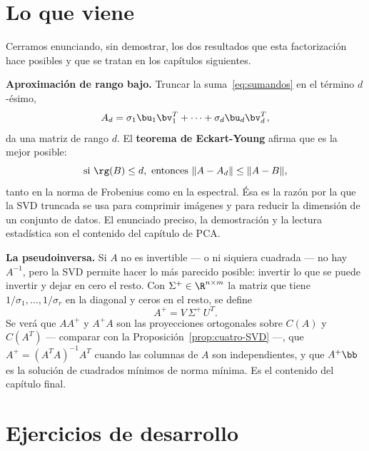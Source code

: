 \section{Lo que viene}
\label{sec:lo-que-viene}

Cerramos enunciando, sin demostrar, los dos resultados que esta factorización
hace posibles y que se tratan en los capítulos siguientes.

\medskip
\noindent\textbf{Aproximación de rango bajo.} Truncar la
suma~\eqref{eq:sumandos} en el término $d$-ésimo,
\[
A_d=\sigma_1\bu_1\bv_1^T+\cdots+\sigma_d\bu_d\bv_d^T ,
\]
da una matriz de rango $d$. El \textbf{teorema de Eckart-Young} afirma que es
la mejor posible:
\[
\text{si } \rg(B)\le d, \text{ entonces } \|A-A_d\|\le\|A-B\| ,
\]
tanto en la norma de Frobenius como en la espectral. Ésa es la razón por la
que la SVD truncada se usa para comprimir imágenes y para reducir la
dimensión de un conjunto de datos. El enunciado preciso, la demostración y la
lectura estadística son el contenido del capítulo de PCA.

\medskip
\noindent\textbf{La pseudoinversa.} Si $A$ no es invertible --- o ni siquiera
cuadrada --- no hay $A^{-1}$, pero la SVD permite hacer lo más parecido
posible: invertir lo que se puede invertir y dejar en cero el resto. Con
$\Sigma^+\in\R^{n\times m}$ la matriz que tiene $1/\sigma_1,\dots,1/\sigma_r$
en la diagonal y ceros en el resto, se define
\[
A^+=V\,\Sigma^+\,U^T .
\]
Se verá que $AA^+$ y $A^+A$ son las proyecciones ortogonales sobre $C(A)$ y
$C(A^T)$ --- comparar con la Proposición~\ref{prop:cuatro-SVD} ---, que
$A^+=(A^TA)^{-1}A^T$ cuando las columnas de $A$ son independientes, y que
$A^+\bb$ es la solución de cuadrados mínimos de norma mínima. Es el contenido
del capítulo final.

\section*{Ejercicios de desarrollo}

